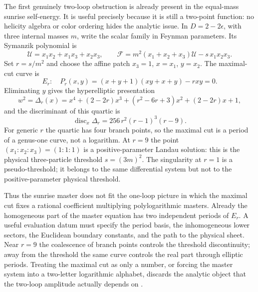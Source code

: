 \begin{controlledapproximation}
\label{ca:two-loop-sunrise-elliptic-maximal-cut}
The first genuinely two-loop obstruction is already present in the equal-mass
sunrise self-energy.  It is useful precisely because it is still a two-point
function: no helicity algebra or color ordering hides the analytic issue.  In
\(D=2-2\epsilon\), with three internal masses \(m\), write the scalar family
in Feynman parameters.  Its Symanzik polynomial is
\begin{equation}
  \mathcal U=x_1x_2+x_1x_3+x_2x_3,
  \qquad
  \mathcal F
  =
  m^2(x_1+x_2+x_3)\mathcal U
  -s\,x_1x_2x_3 .
  \label{eq:sunrise-symanzik-polynomials}
\end{equation}
Set \(r=s/m^2\) and choose the affine patch \(x_3=1\), \(x=x_1\),
\(y=x_2\).  The maximal-cut curve is
\begin{equation}
  E_r:\quad
  P_r(x,y)
  =
  (x+y+1)(xy+x+y)-rxy=0 .
  \label{eq:sunrise-affine-elliptic-curve}
\end{equation}
Eliminating \(y\) gives the hyperelliptic presentation
\begin{equation}
  w^2
  =
  \Delta_r(x)
  =
  x^4+(2-2r)x^3+(r^2-6r+3)x^2+(2-2r)x+1 ,
  \label{eq:sunrise-maximal-cut-quartic}
\end{equation}
and the discriminant of this quartic is
\begin{equation}
  \operatorname{disc}_x\Delta_r
  =
  256\,r^2(r-1)^3(r-9).
  \label{eq:sunrise-quartic-discriminant}
\end{equation}
For generic \(r\) the quartic has four branch points, so the maximal cut is a
period of a genus-one curve, not a logarithm.  At \(r=9\) the point
\((x_1:x_2:x_3)=(1:1:1)\) is a positive-parameter Landau solution: this is the
physical three-particle threshold \(s=(3m)^2\).  The singularity at \(r=1\) is
a pseudo-threshold; it belongs to the same differential system but not to the
positive-parameter physical threshold.

Thus the sunrise master does not fit the one-loop picture in which the
maximal cut fixes a rational coefficient multiplying polylogarithmic masters.
Already the homogeneous part of the master equation has two independent
periods of \(E_r\).  A useful evaluation datum must specify the period basis,
the inhomogeneous lower sectors, the Euclidean boundary constants, and the
path to the physical sheet.  Near \(r=9\) the coalescence of branch points
controls the threshold discontinuity; away from the threshold the same curve
controls the real part through elliptic periods.  Treating the maximal cut as
only a number, or forcing the master system into a two-letter logarithmic
alphabet, discards the analytic object that the two-loop amplitude actually
depends on \cite{LaportaRemiddi2005Sunrise,
AdamsBognerWeinzierl2013Sunrise}.
\end{controlledapproximation}

